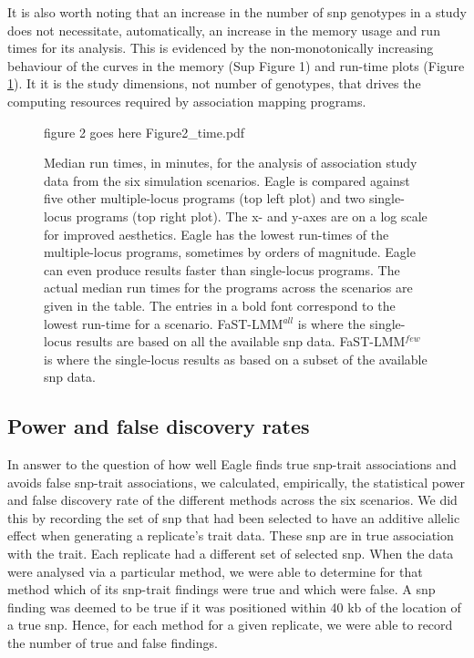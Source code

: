 \documentclass{nature}
\begin{document}
  
 It is also worth noting that an increase in the number of snp genotypes in a study does not necessitate, automatically,  
 an increase in the memory usage and run times for its analysis. This is  evidenced by the non-monotonically 
 increasing behaviour of the curves in the memory (Sup Figure 1) and run-time plots (Figure \ref{fig_time}).  It 
it is the study dimensions, not number of genotypes, that drives the computing resources required by 
association mapping programs.   
 
  
\begin{figure}
\caption{Median run times, in minutes, for the analysis of association study data from the six simulation scenarios. 
Eagle is compared against five other multiple-locus programs (top left plot) and two single-locus programs (top right plot). 
The x- and y-axes are on a log scale for improved aesthetics. Eagle has the lowest run-times of the multiple-locus 
programs, sometimes by orders of magnitude. Eagle can even produce results faster than single-locus programs. 
The actual median run times for the programs across the scenarios are given in the table. The entries in a bold font 
correspond to the lowest run-time for a scenario. 
 FaST-LMM$^{all}$ is where the single-locus results are based on all the available 
snp data. FaST-LMM$^{few}$ is where the single-locus results as based on a subset of the available snp data. }

\label{fig_time}
figure 2 goes here {Figure2_time.pdf}

\end{figure}




\subsection{Power and false discovery rates}


In answer to the question of how well Eagle finds true snp-trait associations and avoids false snp-trait associations, we calculated, empirically, 
the statistical power and false discovery rate of the different methods across the six scenarios. We did this by recording the set of snp that had been selected to have an additive allelic effect when generating a 
replicate's trait data. These snp are in true association with the trait. Each replicate had a different set of selected snp. 
When the data were analysed via a particular method, 
we were able to determine for that method which of its snp-trait findings were true and which were false. A snp finding was deemed to be true if it was positioned within 40 kb of the location of a true snp. Hence, 
for each method for a given replicate, we were able to record the number of true and false findings.   
\end{document}
